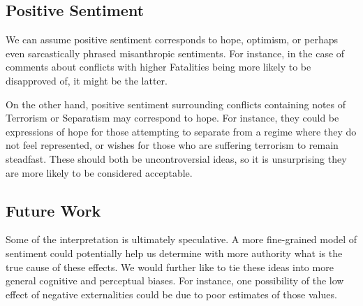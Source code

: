 \subsection{Positive Sentiment}
We can assume positive sentiment corresponds to hope, optimism, or perhaps even sarcastically phrased misanthropic sentiments. For instance, in the case of comments about conflicts with higher Fatalities being more likely to be disapproved of, it might be the latter. 

On the other hand, positive sentiment surrounding conflicts containing notes of Terrorism or Separatism may correspond to hope. For instance, they could be expressions of hope for those attempting to separate from a regime where they do not feel represented, or wishes for those who are suffering terrorism to remain steadfast. These should both be uncontroversial ideas, so it is unsurprising they are more likely to be considered acceptable.

\subsection{Future Work}
Some of the interpretation is ultimately speculative. A more fine-grained model of sentiment could potentially help us determine with more authority what is the true cause of these effects. We would further like to tie these ideas into more general cognitive and perceptual biases. For instance, one possibility of the low effect of negative externalities could be due to poor estimates of those values.